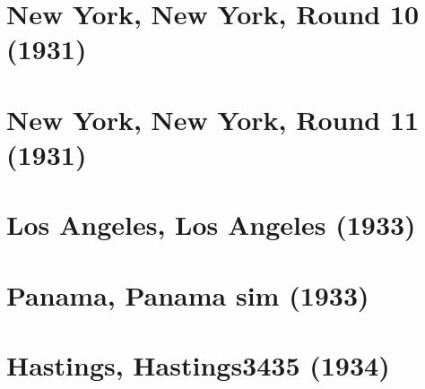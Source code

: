 \documentclass[11pt]{article}
\begin{document}
\clearpage

\section{New York, New York, Round 10 (1931)}


\clearpage

\section{New York, New York, Round 11 (1931)}


\clearpage

\section{Los Angeles, Los Angeles (1933)}


\clearpage

\section{Panama, Panama sim (1933)}


\clearpage



\clearpage

\section{Hastings, Hastings3435 (1934)}


\clearpage



\clearpage



\clearpage



\clearpage



\clearpage



\clearpage



\clearpage



\clearpage


\end{document}
